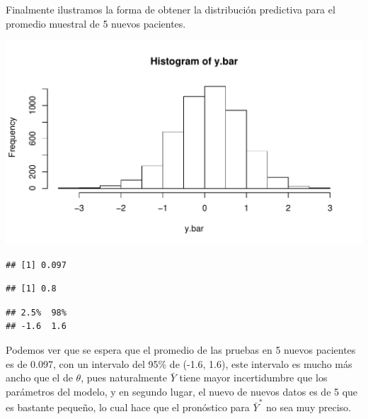 \begin{Eje}
Finalmente ilustramos la forma de obtener la distribución predictiva para el promedio muestral de 5 nuevos pacientes. 
\begin{knitrout}
\color{fgcolor}\begin{kframe}
\begin{alltt}
 \hlkwb{<-}  \hlkwb{<-} \hlstd{()}
  \hlopt{:}\hlopt{/}\hlstd{))\{}
   \hlkwb{<-} \hlstd{(}\hlstd{,theta.pos[i}\hlopt{+}\hlopt{/}\hlstd{],}\hlstd{(sigma2.pos[i}\hlopt{+}\hlopt{/}\hlstd{]}\hlopt{/}
\hlstd{\}}
\end{alltt}
\end{kframe}
\includegraphics[width=\maxwidth]{figure/unnamed-chunk-5-1} 
\begin{kframe}\begin{alltt}
\end{alltt}
\begin{verbatim}
## [1] 0.097
\end{verbatim}
\begin{alltt}
\end{alltt}
\begin{verbatim}
## [1] 0.8
\end{verbatim}
\begin{alltt}
\hlstd{(}\hlstd{,}\hlstd{))}
\end{alltt}
\begin{verbatim}
## 2.5%  98% 
## -1.6  1.6
\end{verbatim}
\end{kframe}
\end{knitrout}
Podemos ver que se espera que el promedio de las pruebas en 5 nuevos pacientes es de 0.097, con un intervalo del 95\% de (-1.6, 1.6), este intervalo es mucho más ancho que el de $\theta$, pues naturalmente $\bar{Y}$ tiene mayor incertidumbre que los parámetros del modelo, y en segundo lugar, el nuevo de nuevos datos es de 5 que es bastante pequeño, lo cual hace que el pronóstico para $\bar{Y}^*$ no sea muy preciso.
\end{Eje}

